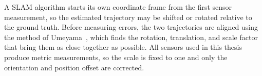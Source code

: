 %
%
%
%
%
%
A SLAM algorithm starts its own coordinate frame from the first sensor
measurement, so the estimated trajectory may be shifted or rotated relative
to the ground truth.
Before measuring errors, the two trajectories are aligned using the method
of Umeyama~\cite{umeyama1991least}, which finds the rotation, translation,
and scale factor that bring them as close together as possible.
All sensors used in this thesis produce metric measurements, so the scale
is fixed to one and only the orientation and position offset are corrected.


